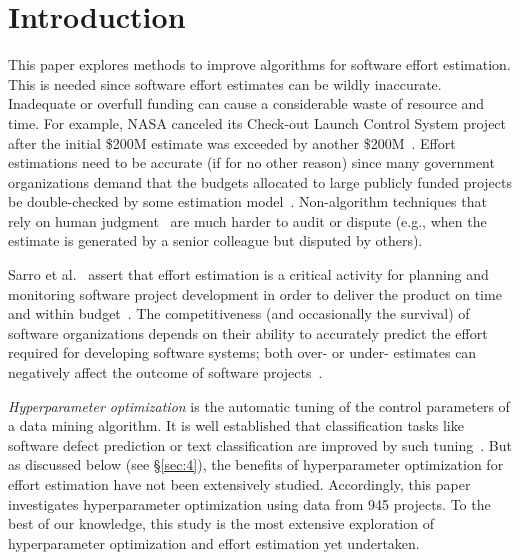 \section{Introduction}
\label{intro}
This paper explores methods to improve algorithms
for software effort estimation.
This is needed since software  effort estimates   can be 
wildly inaccurate\cite{kemerer1987empirical}. Inadequate or overfull funding can cause a considerable waste of resource and time. For example, NASA canceled its  Check-out Launch Control System project after the initial \$200M estimate was exceeded by another \$200M~\cite{cowing02}. Effort estimations need to be accurate  (if for
no other reason) since many government
organizations demand that the budgets allocated to
large publicly funded projects be double-checked by some estimation model~\cite{MenziesNeg:2017}.  
Non-algorithm techniques that rely on human judgment~\cite{jorgensen2004review} are much harder to  
audit or 
dispute (e.g.,  when the estimate is generated by a senior colleague but disputed by others). 

Sarro et al.~\cite{sarro2016multi} assert that effort  estimation  is  a  critical  activity  for  planning  and
monitoring software project development in order to deliver
the  product  on  time  and  within  budget~\cite{briand2002resource,kocaguneli2011experiences,trendowicz2014software}.   The
competitiveness (and occasionally the survival) of software
organizations depends on their ability to accurately predict
the  effort  required  for  developing  software  systems;  both
over- or under- estimates can negatively affect the outcome
of software projects~\cite{trendowicz2014software,mcconnell2006software,mendes2002further,sommerville2010software}.



{\em Hyperparameter optimization}  is the automatic tuning
of the control parameters of a data
mining algorithm.
It is well established that  classification tasks like software defect prediction or 
 text classification are improved by such tuning~\cite{Fu2016TuningFS,tanti18,AGRAWAL2018,agrawal2017better}.
But as discussed below (see  \S\ref{sec:4}), the  benefits of     hyperparameter optimization for   effort estimation 
have not been extensively
studied.  Accordingly, this paper investigates hyperparameter optimization using data from 945   projects.
To the best of our knowledge,
this study is the most extensive exploration  of
hyperparameter optimization and effort estimation yet undertaken. 


